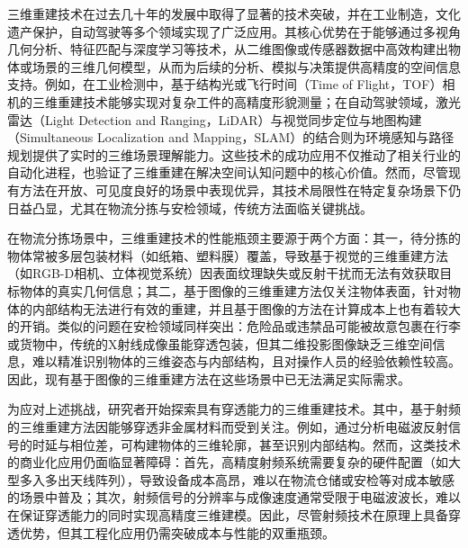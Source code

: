 三维重建技术在过去几十年的发展中取得了显著的技术突破，并在工业制造\cite{DYXU202401004,JSYZ202401074,GXXB202303027}，文化遗产保护\cite{HFYG202301005,GCKC202303009,TAIY202306044}，自动驾驶\cite{GCTX202306003,1024582732.nh,1023946694.nh}等多个领域实现了广泛应用。其核心优势在于能够通过多视角几何分析、特征匹配与深度学习等技术，从二维图像或传感器数据中高效构建出物体或场景的三维几何模型，从而为后续的分析、模拟与决策提供高精度的空间信息支持。例如，在工业检测中，基于结构光或飞行时间（Time of Flight，TOF）相机的三维重建技术能够实现对复杂工件的高精度形貌测量；在自动驾驶领域，激光雷达（Light Detection and Ranging，LiDAR）与视觉同步定位与地图构建（Simultaneous Localization and Mapping，SLAM）的结合则为环境感知与路径规划提供了实时的三维场景理解能力。这些技术的成功应用不仅推动了相关行业的自动化进程，也验证了三维重建在解决空间认知问题中的核心价值。然而，尽管现有方法在开放、可见度良好的场景中表现优异，其技术局限性在特定复杂场景下仍日益凸显，尤其在物流分拣与安检领域，传统方法面临关键挑战。

在物流分拣场景中，三维重建技术的性能瓶颈主要源于两个方面：其一，待分拣的物体常被多层包装材料（如纸箱、塑料膜）覆盖，导致基于视觉的三维重建方法（如RGB-D相机、立体视觉系统）因表面纹理缺失或反射干扰而无法有效获取目标物体的真实几何信息；其二，基于图像的三维重建方法仅关注物体表面，针对物体的内部结构无法进行有效的重建，并且基于图像的方法在计算成本上也有着较大的开销。类似的问题在安检领域同样突出：危险品或违禁品可能被故意包裹在行李或货物中，传统的X射线成像虽能穿透包装，但其二维投影图像缺乏三维空间信息，难以精准识别物体的三维姿态与内部结构，且对操作人员的经验依赖性较高。因此，现有基于图像的三维重建方法在这些场景中已无法满足实际需求。

为应对上述挑战，研究者开始探索具有穿透能力的三维重建技术。其中，基于射频的三维重建方法因能够穿透非金属材料而受到关注。例如，通过分析电磁波反射信号的时延与相位差，可构建物体的三维轮廓，甚至识别内部结构。然而，这类技术的商业化应用仍面临显著障碍：首先，高精度射频系统需要复杂的硬件配置（如大型多入多出天线阵列），导致设备成本高昂，难以在物流仓储或安检等对成本敏感的场景中普及；其次，射频信号的分辨率与成像速度通常受限于电磁波波长，难以在保证穿透能力的同时实现高精度三维建模。因此，尽管射频技术在原理上具备穿透优势，但其工程化应用仍需突破成本与性能的双重瓶颈。

